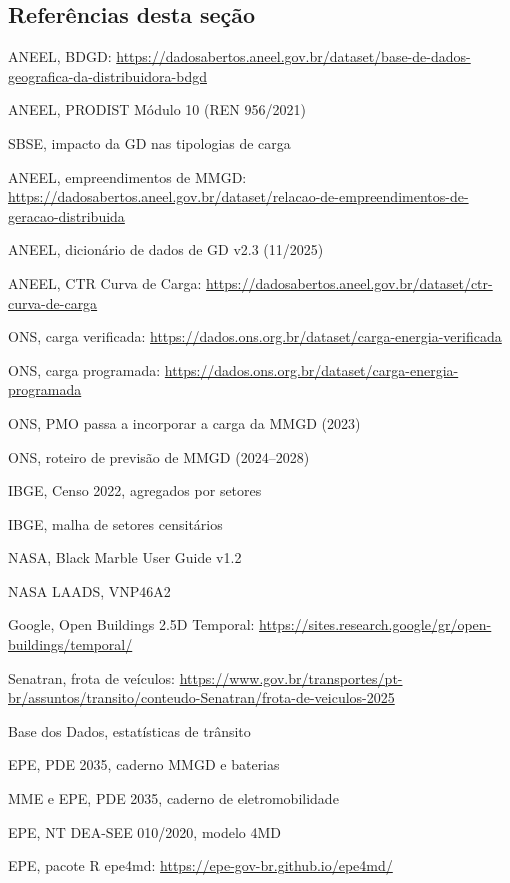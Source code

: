 \subsection*{Referências desta seção}
{\small
\begin{enumerate}[label={[\arabic*]},leftmargin=2.2em,itemsep=1pt]
\item ANEEL, BDGD: \url{https://dadosabertos.aneel.gov.br/dataset/base-de-dados-geografica-da-distribuidora-bdgd}
\item ANEEL, PRODIST Módulo 10 (REN 956/2021)
\item SBSE, impacto da GD nas tipologias de carga
\item ANEEL, empreendimentos de MMGD: \url{https://dadosabertos.aneel.gov.br/dataset/relacao-de-empreendimentos-de-geracao-distribuida}
\item ANEEL, dicionário de dados de GD v2.3 (11/2025)
\item ANEEL, CTR Curva de Carga: \url{https://dadosabertos.aneel.gov.br/dataset/ctr-curva-de-carga}
\item ONS, carga verificada: \url{https://dados.ons.org.br/dataset/carga-energia-verificada}
\item ONS, carga programada: \url{https://dados.ons.org.br/dataset/carga-energia-programada}
\item ONS, PMO passa a incorporar a carga da MMGD (2023)
\item ONS, roteiro de previsão de MMGD (2024--2028)
\item IBGE, Censo 2022, agregados por setores
\item IBGE, malha de setores censitários
\item NASA, Black Marble User Guide v1.2
\item NASA LAADS, VNP46A2
\item Google, Open Buildings 2.5D Temporal: \url{https://sites.research.google/gr/open-buildings/temporal/}
\item Senatran, frota de veículos: \url{https://www.gov.br/transportes/pt-br/assuntos/transito/conteudo-Senatran/frota-de-veiculos-2025}
\item Base dos Dados, estatísticas de trânsito
\item EPE, PDE 2035, caderno MMGD e baterias
\item MME e EPE, PDE 2035, caderno de eletromobilidade
\item EPE, NT DEA-SEE 010/2020, modelo 4MD
\item EPE, pacote R epe4md: \url{https://epe-gov-br.github.io/epe4md/}

\end{enumerate}}
